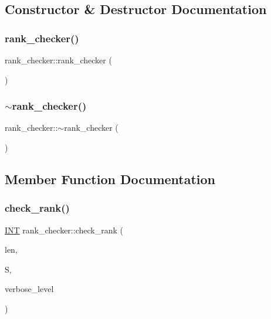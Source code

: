 \subsection{Constructor \& Destructor Documentation}
\mbox{\label{classrank__checker_aaad4380d7b7c9e078f48ae8bbf90537d}} 
\subsubsection{\texorpdfstring{rank\+\_\+checker()}{rank\_checker()}}
{\footnotesize\ttfamily rank\+\_\+checker\+::rank\+\_\+checker (\begin{DoxyParamCaption}{ }\end{DoxyParamCaption})}

\mbox{\label{classrank__checker_a16f5e6c28f1382c31e3fc0ddd12f67fb}} 
\subsubsection{\texorpdfstring{$\sim$rank\+\_\+checker()}{~rank\_checker()}}
{\footnotesize\ttfamily rank\+\_\+checker\+::$\sim$rank\+\_\+checker (\begin{DoxyParamCaption}{ }\end{DoxyParamCaption})}



\subsection{Member Function Documentation}
\mbox{\label{classrank__checker_a5f0fd559a91a39c81268699c8ecadada}} 
\subsubsection{\texorpdfstring{check\+\_\+rank()}{check\_rank()}}
{\footnotesize\ttfamily \mbox{\hyperlink{galois_8h_a09fddde158a3a20bd2dcadb609de11dc}{I\+NT}} rank\+\_\+checker\+::check\+\_\+rank (\begin{DoxyParamCaption}\item[{\mbox{\hyperlink{galois_8h_a09fddde158a3a20bd2dcadb609de11dc}{I\+NT}}}]{len,  }\item[{\mbox{\hyperlink{galois_8h_a09fddde158a3a20bd2dcadb609de11dc}{I\+NT}} $\ast$}]{S,  }\item[{\mbox{\hyperlink{galois_8h_a09fddde158a3a20bd2dcadb609de11dc}{I\+NT}}}]{verbose\+\_\+level }\end{DoxyParamCaption})}

